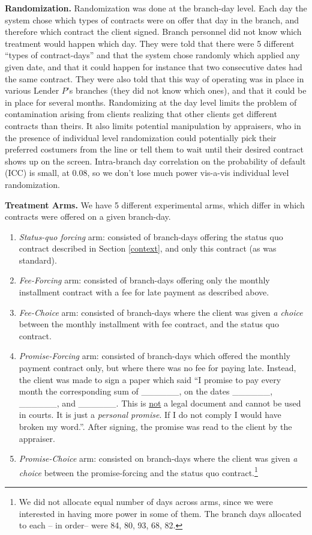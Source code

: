 \documentclass[oneside,11pt]{article}
\begin{document}
\vspace{.2in}
\noindent \textbf{Randomization.} Randomization was done at the branch-day level.  Each day the system chose which types of contracts were on offer that day in the branch, and therefore which contract the client signed. Branch personnel did not know which treatment would happen which day. They were told that there were 5 different ``types of contract-days'' and that the system chose randomly which applied any given date, and that it could happen for instance that two consecutive dates had the same contract. They were also told that this way of operating was in place in various Lender $P$'s branches (they did not know which ones), and that it could be in place for several months. Randomizing at the day level limits the problem of contamination arising from clients realizing that other clients get different contracts than theirs. It also limits potential  manipulation by appraisers, who in the presence of individual level randomization could potentially pick their preferred costumers from the line or tell them to wait until their desired contract shows up on the screen. Intra-branch day correlation on the probability of default (ICC) is small, at 0.08, so we don't lose much power vis-a-vis individual level randomization.

\vspace{.2in}
\noindent \textbf{Treatment Arms.} We have 5 different experimental arms, which differ in which contracts were offered on a given branch-day. 

\begin{enumerate}
    \item \textit{Status-quo forcing} arm: consisted of branch-days offering the status quo contract described in Section \ref{context}, and only this contract (as was standard). 
    \item \textit{Fee-Forcing} arm: consisted of branch-days offering only the monthly installment contract with a fee for late payment as described above. 
    \item \textit{Fee-Choice} arm: consisted of branch-days where the client was given \textit{a choice} between the monthly installment with fee contract, and the status quo contract.
    \item \textit{Promise-Forcing} arm: consisted of branch-days which offered the monthly payment contract only, but where there was no fee for paying late. Instead, the client was made to sign a paper which said ``I promise to pay every month the corresponding sum of \_\_\_\_\_\_, on the dates \_\_\_\_\_\_, \_\_\_\_\_\_, and \_\_\_\_\_\_. This is \underline{not} a legal document and cannot be used in courts. It is just a \textit{personal promise}. If I do not comply I would have broken my word.''. After signing, the promise was read to the client by the appraiser.
    \item \textit{Promise-Choice} arm: consisted on branch-days where the client was given \textit{a choice} between the promise-forcing and the status quo contract.\footnote{We did not allocate equal number of days across arms, since we were interested in having more power in some of them. The branch days allocated to each -- in order-- were 84, 80, 93, 68, 82.}
\end{enumerate}
\end{document}
